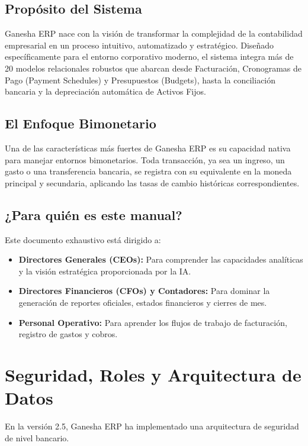 \documentclass[12pt, a4paper, oneside]{book}
\begin{document}
\section{Propósito del Sistema}
Ganesha ERP nace con la visión de transformar la complejidad de la contabilidad empresarial en un proceso intuitivo, automatizado y estratégico. Diseñado específicamente para el entorno corporativo moderno, el sistema integra más de 20 modelos relacionales robustos que abarcan desde Facturación, Cronogramas de Pago (Payment Schedules) y Presupuestos (Budgets), hasta la conciliación bancaria y la depreciación automática de Activos Fijos.

\section{El Enfoque Bimonetario}
Una de las características más fuertes de Ganesha ERP es su capacidad nativa para manejar entornos bimonetarios. Toda transacción, ya sea un ingreso, un gasto o una transferencia bancaria, se registra con su equivalente en la moneda principal y secundaria, aplicando las tasas de cambio históricas correspondientes.

\section{¿Para quién es este manual?}
Este documento exhaustivo está dirigido a:
\begin{itemize}
    \item \textbf{Directores Generales (CEOs):} Para comprender las capacidades analíticas y la visión estratégica proporcionada por la IA.
    \item \textbf{Directores Financieros (CFOs) y Contadores:} Para dominar la generación de reportes oficiales, estados financieros y cierres de mes.
    \item \textbf{Personal Operativo:} Para aprender los flujos de trabajo de facturación, registro de gastos y cobros.
\end{itemize}

\chapter{Seguridad, Roles y Arquitectura de Datos}

En la versión 2.5, Ganesha ERP ha implementado una arquitectura de seguridad de nivel bancario.
\end{document}
